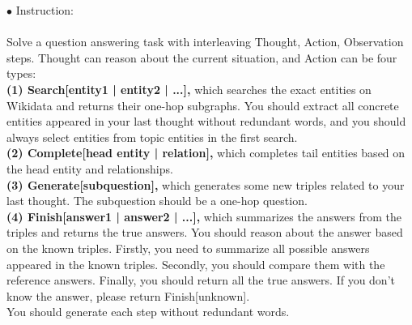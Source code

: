 \begin{tcolorbox}[prompt=
{\begin{prompt} \label{prompts for instruction used in knowledge extraction}The Prompt for the Training Phase of JCQL 
\end{prompt}}]
$\bullet$ Instruction: \\ \\
Solve a question answering task with interleaving Thought, Action, Observation steps. Thought can reason about the current situation, and Action can be four types: \\
\textbf{(1) Search[entity1 | entity2 | ...],} which searches the exact entities on Wikidata and returns their one-hop subgraphs. You should extract all concrete entities appeared in your last thought without redundant words, and you should always select entities from topic entities in the first search. \\
\textbf{(2) Complete[head entity | relation],} which completes tail entities based on the head entity and relationships. \\ 
\textbf{(3) Generate[subquestion],} which generates some new triples related to your last thought. The subquestion should be a one-hop question. \\
\textbf{(4) Finish[answer1 | answer2 | ...],} which summarizes the answers from the triples and returns the true answers. You should reason about the answer based on the known triples. Firstly, you need to summarize all possible answers appeared in the known triples. Secondly, you should compare them with the reference answers. Finally, you should return all the true answers. If you don't know the answer, please return Finish[unknown].\\
You should generate each step without redundant words. \\


\end{tcolorbox}
